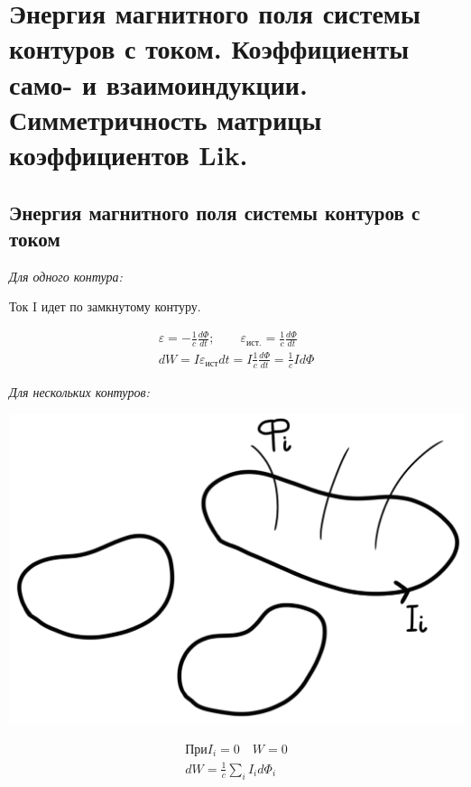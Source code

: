 \section{Энергия магнитного поля системы контуров с током. Коэффициенты само-
и взаимоиндукции. Симметричность матрицы коэффициентов Lik.}

\subsection*{Энергия магнитного поля системы контуров с током}

\textit{Для одного контура:}

Ток I идет по замкнутому контуру.

\begin{gather*}
    \varepsilon=-\frac{1}{c}\frac{d\Phi}{dt}; \qquad \varepsilon_{\text{ист.}}=\frac{1}{c}\frac{d\Phi}{dt} \\
    dW=I\varepsilon_{\text{ист}}dt=I \frac{1}{c}\frac{d\Phi}{dt}=\frac{1}{c}Id\Phi     
\end{gather*}

\textit{Для нескольких контуров:}

\begin{minipage}[c]{0.4\textwidth} %
    \includegraphics[width=\textwidth]{im/93.png}%
\end{minipage}%
\hfill
\begin{minipage}[c]{0.6\textwidth} %
    \begin{gather*}
        \text{При} I_i=0 \quad W=0 \\
        dW=\frac{1}{c}\sum_{i}I_id\Phi_i 
    \end{gather*}
\end{minipage}

